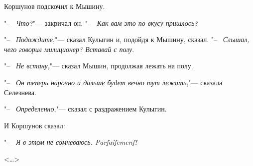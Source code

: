 Коршунов подскочил к Мышину.

"--~ \textit{Что?}"--- закричал он. "--~ \textit{Как вам это по вкусу пришлось?}

"--~ \textit{Подождите},"--- сказал Кулыгин и, подойдя к Мышину, сказал. "--~ \textit{Слышал, чего говорил милиционер? Вставай с полу}.

"--~ \textit{Не встану},"--- сказал Мышин, продолжая лежать на полу.

"--~ \textit{Он теперь нарочно и дальше будет вечно тут лежать},"--- сказала Селезнева.

"--~ \textit{Определенно},"--- сказал с раздражением Кулыгин.

И Коршунов сказал:

"--~ \textit{Я в этом не сомневаюсь. Parfaifemenf!}

\begin{flushright}
    <\dots>
\end{flushright}